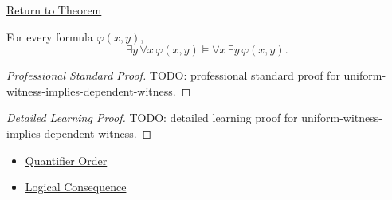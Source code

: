 \newpage
{}
\label{prf:uniform-witness-implies-dependent-witness}

\begin{remark*}[Return]
\hyperref[thm:uniform-witness-implies-dependent-witness]{Return to Theorem}
\end{remark*}

\begin{theorem*}
For every formula \(\varphi(x,y)\),
\[
\exists y\,\forall x\,\varphi(x,y)
\models
\forall x\,\exists y\,\varphi(x,y).
\]
\end{theorem*}

\begin{proof}[Professional Standard Proof]
\LRAProofBodyStart
TODO: professional standard proof for uniform-witness-implies-dependent-witness.
\end{proof}

\begin{proof}[Detailed Learning Proof]
\LRAProofBodyStart
TODO: detailed learning proof for uniform-witness-implies-dependent-witness.
\end{proof}

\begin{remark*}
\end{remark*}

\begin{dependencies}
\begin{itemize}
  \item \hyperref[def:q-alt]{Quantifier Order}
  \item \hyperref[def:log-consequence]{Logical Consequence}
\end{itemize}
\end{dependencies}

\clearpage
